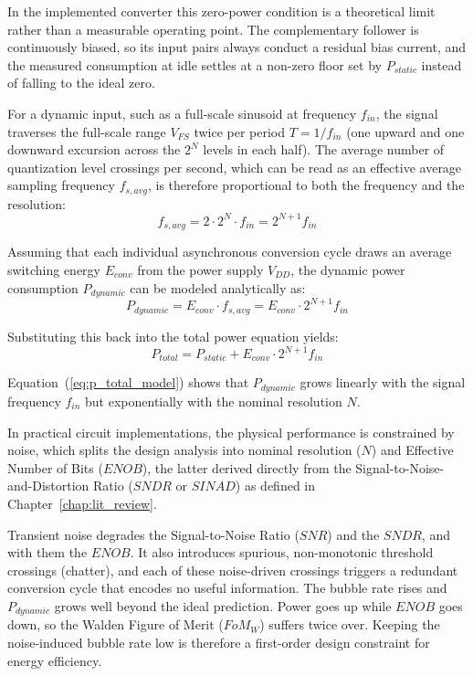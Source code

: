 In the implemented converter this zero-power condition is a theoretical limit rather than a measurable operating point. The complementary follower is continuously biased, so its input pairs always conduct a residual bias current, and the measured consumption at idle settles at a non-zero floor set by $P_{static}$ instead of falling to the ideal zero.

For a dynamic input, such as a full-scale sinusoid at frequency $f_{in}$, the signal traverses the full-scale range $V_{FS}$ twice per period $T = 1/f_{in}$ (one upward and one downward excursion across the $2^N$ levels in each half). The average number of quantization level crossings per second, which can be read as an effective average sampling frequency $f_{s,avg}$, is therefore proportional to both the frequency and the resolution:
\begin{equation}
    f_{s,avg} = 2 \cdot 2^N \cdot f_{in} = 2^{N+1} f_{in}
\end{equation}

Assuming that each individual asynchronous conversion cycle draws an average switching energy $E_{conv}$ from the power supply $V_{DD}$, the dynamic power consumption $P_{dynamic}$ can be modeled analytically as:
\begin{equation}
    P_{dynamic} = E_{conv} \cdot f_{s,avg} = E_{conv} \cdot 2^{N+1} f_{in}
\end{equation}

Substituting this back into the total power equation yields:
\begin{equation}
    P_{total} = P_{static} + E_{conv} \cdot 2^{N+1} f_{in}
    \label{eq:p_total_model}
\end{equation}

Equation~(\ref{eq:p_total_model}) shows that $P_{dynamic}$ grows linearly with the signal frequency $f_{in}$ but exponentially with the nominal resolution $N$.

In practical circuit implementations, the physical performance is constrained by noise, which splits the design analysis into nominal resolution ($N$) and Effective Number of Bits ($ENOB$), the latter derived directly from the Signal-to-Noise-and-Distortion Ratio ($SNDR$ or $SINAD$) as defined in Chapter~\ref{chap:lit_review}.

Transient noise degrades the Signal-to-Noise Ratio ($SNR$) and the $SNDR$, and with them the $ENOB$. It also introduces spurious, non-monotonic threshold crossings (chatter), and each of these noise-driven crossings triggers a redundant conversion cycle that encodes no useful information. The bubble rate rises and $P_{dynamic}$ grows well beyond the ideal prediction. Power goes up while $ENOB$ goes down, so the Walden Figure of Merit ($FoM_W$) suffers twice over. Keeping the noise-induced bubble rate low is therefore a first-order design constraint for energy efficiency.

